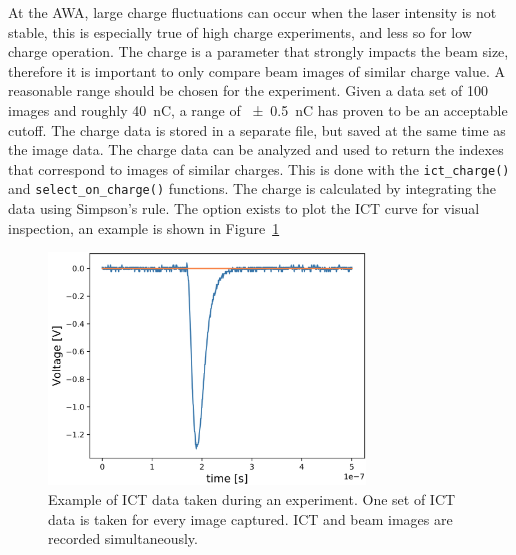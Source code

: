 At the AWA, large charge fluctuations can occur when the laser intensity is not stable, 
this is especially true of high charge experiments, and less so for low charge operation.
The charge is a parameter that strongly impacts the beam size, 
therefore it is important to only compare beam images of similar charge value.
A reasonable range should be chosen for the experiment. 
Given a data set of 100 images and  roughly \SI{40}{nC}, 
a range of \SI{\pm0.5}{nC} has proven to be an acceptable cutoff.
The charge data is stored in a separate file, 
but saved at the same time as the image data. 
The charge data can be analyzed and used to return the indexes
that correspond to images of similar charges. 
This is done with the \verb|ict_charge()| and \verb|select_on_charge()| functions.
The charge is calculated by integrating the data using Simpson's rule.
The option exists to plot the ICT curve for visual inspection, an 
example is shown in Figure~\ref{fig:ict}
\begin{figure}
	\centering
	\includegraphics[width=0.75\textwidth]{images/ictcurve}
	\caption{Example of ICT data taken during an experiment. 
	One set of ICT data is taken for every image captured. 
	ICT and beam images are recorded simultaneously.}
	\label{fig:ict}
\end{figure}

